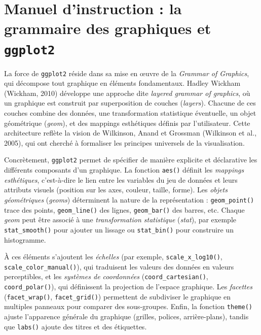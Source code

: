 \documentclass[
  letterpaper,
  DIV=11,
  numbers=noendperiod,
  oneside]{scrreprt}
\begin{document}
\hypertarget{manuel-dinstruction-la-grammaire-des-graphiques-et-ggplot2}{%
\section{\texorpdfstring{Manuel d'instruction : la grammaire des
graphiques et
\texttt{ggplot2}}{Manuel d'instruction : la grammaire des graphiques et ggplot2}}\label{manuel-dinstruction-la-grammaire-des-graphiques-et-ggplot2}}

La force de \texttt{ggplot2} réside dans sa mise en œuvre de la
\emph{Grammar of Graphics}, qui décompose tout graphique en éléments
fondamentaux. Hadley Wickham (Wickham, 2010) développe une approche dite
\emph{layered grammar of graphics}, où un graphique est construit par
superposition de couches (\emph{layers}). Chacune de ces couches combine
des données, une transformation statistique éventuelle, un objet
géométrique (\emph{geom}), et des mappings esthétiques définis par
l'utilisateur. Cette architecture reflète la vision de Wilkinson, Anand
et Grossman (Wilkinson et al., 2005), qui ont cherché à formaliser les
principes universels de la visualisation.

Concrètement, \texttt{ggplot2} permet de spécifier de manière explicite
et déclarative les différents composants d'un graphique. La fonction
\texttt{aes()} définit les \emph{mappings esthétiques}, c'est-à-dire le
lien entre les variables du jeu de données et leurs attributs visuels
(position sur les axes, couleur, taille, forme). Les \emph{objets
géométriques} (\emph{geoms}) déterminent la nature de la représentation
: \texttt{geom\_point()} trace des points, \texttt{geom\_line()} des
lignes, \texttt{geom\_bar()} des barres, etc. Chaque \emph{geom} peut
être associé à une \emph{transformation statistique} (\emph{stat}), par
exemple \texttt{stat\_smooth()} pour ajouter un lissage ou
\texttt{stat\_bin()} pour construire un histogramme.

À ces éléments s'ajoutent les \emph{échelles} (par exemple,
\texttt{scale\_x\_log10()}, \texttt{scale\_color\_manual()}), qui
traduisent les valeurs des données en valeurs perceptibles, et les
\emph{systèmes de coordonnées} (\texttt{coord\_cartesian()},
\texttt{coord\_polar()}), qui définissent la projection de l'espace
graphique. Les \emph{facettes} (\texttt{facet\_wrap()},
\texttt{facet\_grid()}) permettent de subdiviser le graphique en
multiples panneaux pour comparer des sous-groupes. Enfin, la fonction
\texttt{theme()} ajuste l'apparence générale du graphique (grilles,
polices, arrière-plans), tandis que \texttt{labs()} ajoute des titres et
des étiquettes.
\end{document}

